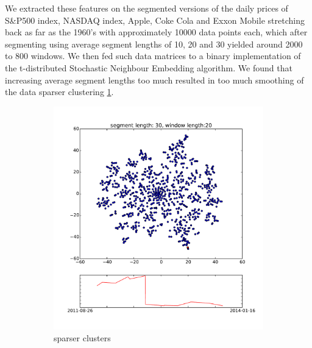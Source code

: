 \documentclass{article} %
\begin{document}
We extracted these features on the segmented versions of the daily prices of S\&P500 index, NASDAQ index, Apple, Coke Cola and Exxon Mobile stretching back as far as the 1960's with approximately 10000 data points each, which after segmenting using average segment lengths of 10, 20 and 30 yielded around 2000 to 800 windows. We then fed such data matrices to a binary implementation of the t-distributed Stochastic Neighbour Embedding algorithm. We found that increasing average segment lengths too much resulted in too much smoothing of the data sparser clustering \ref{fig:kosparseclu}.
\begin{figure}[h]
\begin{center}
\begin{subfigure}[b]{0.49\textwidth}
\includegraphics[width=1\textwidth]{ko-30-20-nopattern1.pdf}
                \caption{sparser clusters}
                \label{fig:kosparseclu}
        \end{subfigure}
        \begin{subfigure}[b]{0.49\textwidth}

\end{subfigure}
\end{center}
\end{figure}
\end{document}
